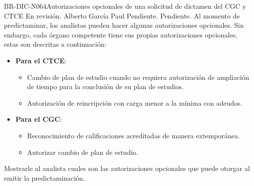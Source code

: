 \begin{BusinessRule}{BR-DIC-N064}{Autorizaciones opcionales de una solicitud de dictamen del CGC y CTCE}
	{\bcCondition} %
	{\btEnabler}     %
	{\blControlling}     %
	\BRItem[Estado] En revisión.
	 Alberto García Paul 
	 Pendiente.
	 Pendiente. 
	\BRItem[Descripción] Al momento de predictaminar, los analistas pueden hacer algunas autorizaciones opcionales. Sin embargo, cada órgano competente tiene sus propias autorizaciones opcionales, estas son descritas a continuación:
	\begin{itemize}
		\item \textbf{Para el CTCE}:
		\begin{itemize}
			\item Cambio de plan de estudio cuando no requiera autorización de ampliación de tiempo para la conclusión de su plan de estudios.
			\item Autorización de reincripción con carga menor a la mínima con adeudos.
		\end{itemize}
		\item \textbf{Para el CGC}:
		\begin{itemize}
			\item Reconocimiento de calificaciones acreditadas de manera extemporánea.
			\item Autorizar cambio de plan de estudio.
		\end{itemize}
	\end{itemize}
	\BRItem[Motivación] Mostrarle al analista cuales son las autorizaciones opcionales que puede otorgar al emitir la predictaminación.
\end{BusinessRule}




